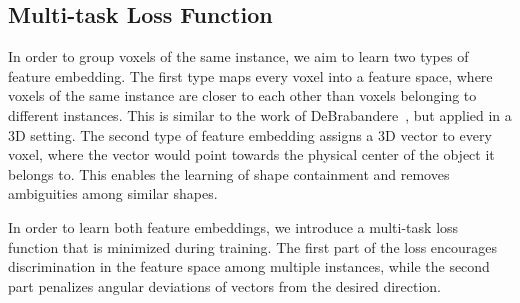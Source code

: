 \documentclass[10pt,twocolumn,letterpaper]{article}
\begin{document}
\subsection{Multi-task Loss Function} \label{subsec:loss}
In order to group voxels of the same instance, we aim to learn two types of feature embedding.
The first type maps every voxel into a feature space, where voxels of the same instance are closer to each other than voxels belonging to different instances.
This is similar to the work of DeBrabandere~\etal\cite{DeBrabandere-et-al-arXiv-2017}, but applied in a 3D setting.
The second type of feature embedding assigns a 3D vector to every voxel, where the vector would point towards the physical center of the object it belongs to.
This enables the learning of shape containment and removes ambiguities among similar shapes.

In order to learn both feature embeddings, we introduce a multi-task loss function that is minimized during training. 
The first part of the loss encourages discrimination in the feature space among multiple instances, while the second part penalizes angular deviations of vectors from the desired direction.
\end{document}

